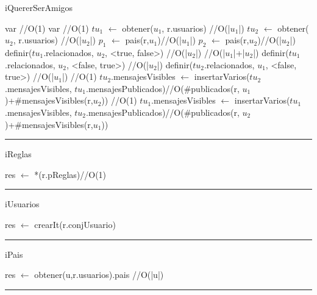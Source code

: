\begin{algorithm}[H]
\caption{iQuererSerAmigos}
\begin{algorithmic}[1]
\state var  \hfill//O(1)
\state var \hfill//O(1)
\state $tu_1$ $\gets$ obtener($u_1$, r.usuarios) \hfill//O(|$u_1$|)
\state $tu_2$ $\gets$ obtener($u_2$, r.usuarios) \hfill//O(|$u_2$|)
\state $p_1$ $\gets$ pais(r,$u_1$)\hfill//O(|$u_1$|)
\state $p_2$ $\gets$ pais(r,$u_2$)\hfill//O(|$u_2$|)
\state definir($tu_1$.relacionados, $u_2$, <true, false>) \hfill//O(|$u_2$|)
 \hfill//O(|$u_1$|+|$u_2$|)
\state definir($tu_1$.relacionados, $u_2$, <false, true>) \hfill//O(|$u_2$|)
\state definir($tu_2$.relacionados, $u_1$, <false, true>) \hfill//O(|$u_1$|)
 \hfill//O(1)
\state $tu_2$.mensajesVisibles $\gets$ insertarVarios($tu_2$.mensajesVisibles, $tu_1$.mensajesPublicados)\hfill//O(\#publicados(r, $u_1$)+\#mensajesVisibles(r,$u_2$))
\endif
{} \hfill//O(1)
\state $tu_1$.mensajesVisibles $\gets$ insertarVarios($tu_1$.mensajesVisibles, $tu_2$.mensajesPublicados)\hfill//O(\#publicados(r, $u_2$)+\#mensajesVisibles(r,$u_1$))
\endif
\endif
\EndFunction 
\end{algorithmic}
\hrule
{}
\end{algorithm}

\begin{algorithm}[H]
\caption{iReglas}
\begin{algorithmic}[1]
\State res $\gets$ *(r.pReglas)\hfill //O(1)
\EndFunction 
\end{algorithmic}
\hrule
{}
\end{algorithm}

\begin{algorithm}[H]
\caption{iUsuarios}
\begin{algorithmic}[1]
\state res $\gets$ crearIt(r.conjUsuario)
\EndFunction 
\end{algorithmic}
\hrule
{}
\end{algorithm}

\begin{algorithm}[H]
\caption{iPais}
\begin{algorithmic}[1]
\state res $\gets$ obtener(u,r.usuarios).pais \hfill//O(|u|)
\EndFunction 
\end{algorithmic}
\hrule
{}
\end{algorithm}

